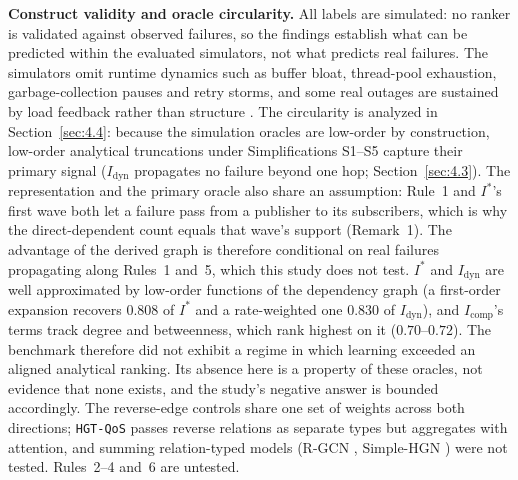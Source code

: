 \documentclass[preprint,3p]{elsarticle}
\begin{document}
\noindent\textbf{Construct validity and oracle circularity.} All labels are simulated: no ranker is validated against observed failures, so the findings establish what can be predicted within the evaluated simulators, not what predicts real failures. The simulators omit runtime dynamics such as buffer bloat, thread-pool exhaustion, garbage-collection pauses and retry storms, and some real outages are sustained by load feedback rather than structure \cite{bronson2021metastable,huang2022metastable}. The circularity is analyzed in Section~\ref{sec:4.4}: because the simulation oracles are low-order by construction, low-order analytical truncations under Simplifications S1--S5 capture their primary signal ($I_{\text{dyn}}$ propagates no failure beyond one hop; Section~\ref{sec:4.3}). The representation and the primary oracle also share an assumption: Rule~1 and $I^*$'s first wave both let a failure pass from a publisher to its subscribers, which is why the direct-dependent count equals that wave's support (Remark~1). The advantage of the derived graph is therefore conditional on real failures propagating along Rules~1 and~5, which this study does not test. $I^*$ and $I_{\text{dyn}}$ are well approximated by low-order functions of the dependency graph (a first-order expansion recovers $0.808$ of $I^*$ and a rate-weighted one $0.830$ of $I_{\text{dyn}}$), and $I_{\text{comp}}$'s terms track degree and betweenness, which rank highest on it ($0.70$--$0.72$). The benchmark therefore did not exhibit a regime in which learning exceeded an aligned analytical ranking. Its absence here is a property of these oracles, not evidence that none exists, and the study's negative answer is bounded accordingly. The reverse-edge controls share one set of weights across both directions; \texttt{HGT-QoS} passes reverse relations as separate types but aggregates with attention, and summing relation-typed models (R-GCN \cite{schlichtkrull2018rgcn}, Simple-HGN \cite{lv2021revisiting}) were not tested. Rules~2--4 and~6 are untested.
\end{document}

